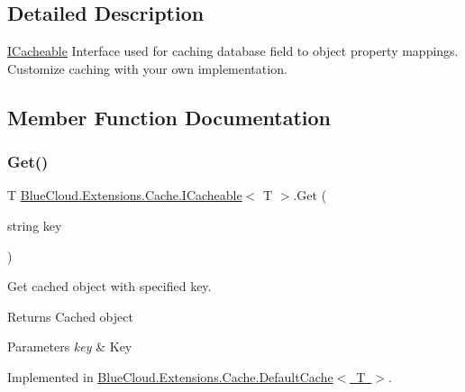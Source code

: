 \subsection{Detailed Description}
\mbox{\hyperlink{interface_blue_cloud_1_1_extensions_1_1_cache_1_1_i_cacheable}{I\+Cacheable}} Interface used for caching database field to object property mappings. Customize caching with your own implementation. 



\subsection{Member Function Documentation}
\mbox{\label{interface_blue_cloud_1_1_extensions_1_1_cache_1_1_i_cacheable_aadcdce6338f6c4aaafc6c3068c4b6dc1}} 
\subsubsection{\texorpdfstring{Get()}{Get()}}
{\footnotesize\ttfamily T \mbox{\hyperlink{interface_blue_cloud_1_1_extensions_1_1_cache_1_1_i_cacheable}{Blue\+Cloud.\+Extensions.\+Cache.\+I\+Cacheable}}$<$ T $>$.Get (\begin{DoxyParamCaption}\item[{string}]{key }\end{DoxyParamCaption})}



Get cached object with specified key. 

\begin{DoxyReturn}{Returns}
Cached object
\end{DoxyReturn}

\begin{DoxyParams}{Parameters}
{\em key} & Key\\
\hline
\end{DoxyParams}


Implemented in \mbox{\hyperlink{class_blue_cloud_1_1_extensions_1_1_cache_1_1_default_cache_a93bb4ec6f9ec285c1d13a9f44ed3e48f}{Blue\+Cloud.\+Extensions.\+Cache.\+Default\+Cache$<$ T $>$}}.

\mbox{\label{interface_blue_cloud_1_1_extensions_1_1_cache_1_1_i_cacheable_a668a7dff25dcd6a612830c4d15fe73cb}} 
